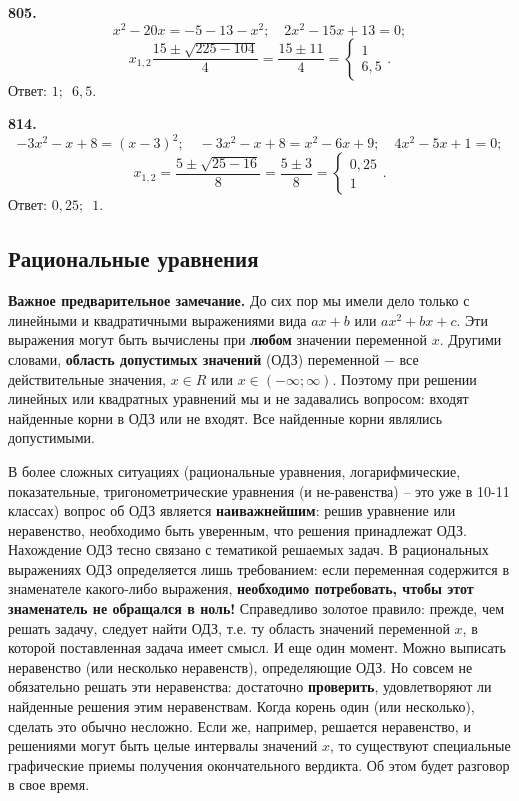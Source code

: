 \textbf{805.} $$x^2-20x=-5-13-x^2;\quad 2x^2-15x+13=0;$$$$ x_{1,2}\frac{15\pm\sqrt{225-104}}{4}=\frac{15\pm11}{4}=\begin{cases}1 \\6,5 \end{cases}.$$ \newline \null \hspace*{\fill} Ответ: $1;\enspace6,5$. 

\textbf{814.} $$-3x^2-x+8=(x-3)^2;\quad -3x^2-x+8=x^2-6x+9;\quad 4x^2-5x+1=0;$$$$ x_{1,2}=\frac{5\pm\sqrt{25-16}}{8}=\frac{5\pm3}{8}=\begin{cases}0,25 \\1 \end{cases}.$$ \newline \null \hspace*{\fill} Ответ: $0,25;\enspace1$. 

\subsection{Рациональные уравнения}


\textbf{Важное предварительное замечание.} До сих пор мы имели дело только с линейными и квадратичными выражениями вида $ax+b$ или $ax^2+bx+c$. Эти выражения могут быть вычислены при \textbf{любом}  значении переменной $x$. Другими словами, \textbf{область допустимых значений} (ОДЗ)  переменной $-$ все действительные значения, $x\in R$ или $x\in (-\infty;\infty)$. Поэтому при решении линейных или квадратных уравнений мы и не задавались вопросом: входят найденные корни в ОДЗ или не входят. Все найденные корни являлись допустимыми.

В более сложных ситуациях (рациональные уравнения, логарифмические, показательные, тригонометрические уравнения (и не-\newline равенства) – это уже в 10-11 классах)  вопрос об ОДЗ  является \textbf{наиважнейшим}:  решив уравнение или неравенство, необходимо быть уверенным, что решения принадлежат ОДЗ. 
Нахождение ОДЗ тесно связано с тематикой решаемых задач. В рациональных выражениях ОДЗ определяется лишь требованием: если переменная содержится в знаменателе какого-либо выражения, \textbf{необходимо потребовать, чтобы этот знаменатель не обращался в ноль!} Справедливо золотое правило: прежде, чем решать задачу, следует найти ОДЗ, т.е. ту область значений переменной $x$, в которой поставленная задача имеет смысл.
И еще один момент. Можно выписать неравенство (или несколько неравенств), определяющие ОДЗ. Но совсем не обязательно решать эти неравенства: достаточно \textbf{проверить}, удовлетворяют ли найденные решения этим неравенствам. Когда корень один (или несколько), сделать это обычно несложно. Если же, например, решается неравенство, и решениями могут быть целые интервалы значений $x$, то существуют специальные графические приемы получения окончательного вердикта. Об этом будет разговор в свое время.

